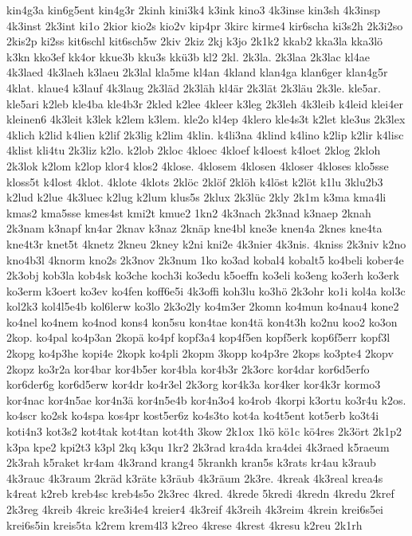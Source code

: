 {kin4g3a
kin6g5ent
kin4g3r
2kinh
kini3k4
k3ink
kino3
4k3inse
kin3sh
4k3insp
4k3inst
2k3int
ki1o
2kior
kio2s
kio2v
kip4pr
3kirc
kirme4
kir6scha
ki3s2h
2k3i2so
2kis2p
ki2ss
kit6schl
kit6sch5w
2kiv
2kiz
2kj
k3jo
2k1k2
kkab2
kka3la
kka3lö
k3kn
kko3ef
kk4or
kkue3b
kku3s
kkü3b
kl2
2kl.
2k3la.
2k3laa
2k3lac
kl4ae
4k3laed
4k3laeh
k3laeu
2k3lal
kla5me
kl4an
4kland
klan4ga
klan6ger
klan4g5r
4klat.
klaue4
k3lauf
4k3laug
2k3läd
2k3läh
kl4är
2k3lät
2k3läu
2k3le.
kle5ar.
kle5ari
k2leb
kle4ba
kle4b3r
2kled
k2lee
4kleer
k3leg
2k3leh
4k3leib
k4leid
klei4er
kleinen6
4k3leit
k3lek
k2lem
k3lem.
kle2o
kl4ep
4klero
kle4s3t
k2let
kle3us
2k3lex
4klich
k2lid
k4lien
k2lif
2k3lig
k2lim
4klin.
k4li3na
4klind
k4lino
k2lip
k2lir
k4lisc
4klist
kli4tu
2k3liz
k2lo.
k2lob
2kloc
4kloec
4kloef
k4loest
k4loet
2klog
2kloh
2k3lok
k2lom
k2lop
klor4
klos2
4klose.
4klosem
4klosen
4kloser
4kloses
klo5sse
kloss5t
k4lost
4klot.
4klote
4klots
2klöc
2klöf
2klöh
k4löst
k2löt
k1lu
3klu2b3
k2lud
k2lue
4k3luec
k2lug
k2lum
klus5s
2klux
2k3lüc
2kly
2k1m
k3ma
kma4li
kmas2
kma5sse
kmes4st
kmi2t
kmue2
1kn2
4k3nach
2k3nad
k3naep
2knah
2k3nam
k3napf
kn4ar
2knav
k3naz
2knäp
kne4bl
kne3e
knen4a
2knes
kne4ta
kne4t3r
knet5t
4knetz
2kneu
2kney
k2ni
kni2e
4k3nier
4k3nis.
4kniss
2k3niv
k2no
kno4b3l
4knorm
kno2s
2k3nov
2k3num
1ko
ko3ad
kobal4
kobalt5
ko4beli
kober4e
2k3obj
kob3la
kob4sk
ko3che
koch3i
ko3edu
k5oeffn
ko3eli
ko3eng
ko3erh
ko3erk
ko3erm
k3oert
ko3ev
ko4fen
koff6e5i
4k3offi
koh3lu
ko3hö
2k3ohr
ko1i
kol4a
kol3c
kol2k3
kol4l5e4b
kol6lerw
ko3lo
2k3o2ly
ko4m3er
2komn
ko4mun
ko4nau4
kone2
ko4nel
ko4nem
ko4nod
kons4
kon5su
kon4tae
kon4tä
kon4t3h
ko2nu
koo2
ko3on
2kop.
ko4pal
ko4p3an
2kopä
ko4pf
kopf3a4
kop4f5en
kopf5erk
kop6f5err
kopf3l
2kopg
ko4p3he
kopi4e
2kopk
ko4pli
2kopm
3kopp
ko4p3re
2kops
ko3pte4
2kopv
2kopz
ko3r2a
kor4bar
kor4b5er
kor4bla
kor4b3r
2k3orc
kor4dar
kor6d5erfo
kor6der6g
kor6d5erw
kor4dr
ko4r3el
2k3org
kor4k3a
kor4ker
kor4k3r
kormo3
kor4nac
kor4n5ae
kor4n3ä
kor4n5e4b
kor4n3o4
ko4rob
4korpi
k3ortu
ko3r4u
k2os.
ko4scr
ko2sk
ko4spa
kos4pr
kost5er6z
ko4s3to
kot4a
ko4t5ent
kot5erb
ko3t4i
koti4n3
kot3s2
kot4tak
kot4tan
kot4th
3kow
2k1ox
1kö
kö1c
kö4res
2k3ört
2k1p2
k3pa
kpe2
kpi2t3
k3pl
2kq
k3qu
1kr2
2k3rad
kra4da
kra4dei
4k3raed
k5raeum
2k3rah
k5raket
kr4am
4k3rand
krang4
5krankh
kran5s
k3rats
kr4au
k3raub
4k3rauc
4k3raum
2kräd
k3räte
k3räub
4k3räum
2k3re.
4kreak
4k3real
krea4s
k4reat
k2reb
kreb4sc
kreb4s5o
2k3rec
4kred.
4krede
5kredi
4kredn
4kredu
2kref
2k3reg
4kreib
4kreic
kre3i4e4
kreier4
4k3reif
4k3reih
4k3reim
4krein
krei6s5ei
krei6s5in
kreis5ta
k2rem
krem4l3
k2reo
4krese
4krest
4kresu
k2reu
2k1rh
}
